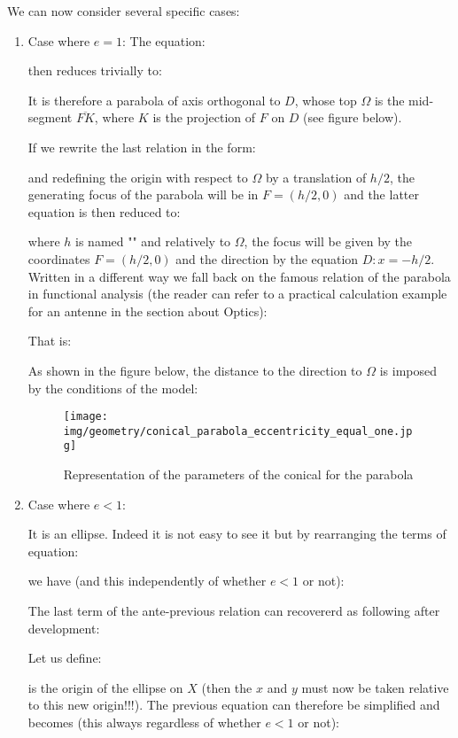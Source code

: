 	We can now consider several specific cases:
	\begin{enumerate}
		\item Case where $e=1$:
		The equation:
		
		then reduces trivially to:
		
		It is therefore a parabola of axis orthogonal to $D$, whose top $\Omega$ is the mid-segment $\overline{FK}$, where $K$ is the projection of $F$ on $D$ (see figure below).
		
		If we rewrite the last relation in the form:
		
		and redefining the origin with respect to $\Omega$ by a translation of $h/2$, the generating focus of the parabola will be in $F=(h/2,0)$ and the latter equation is then reduced to:
		
		where $h$ is named "" and relatively to $\Omega$, the focus will be given by the coordinates $F=(h/2,0)$ and the direction by the equation $D:x=-h/2$. Written in a different way we fall back on the famous relation of the parabola in functional analysis (the reader can refer to a practical calculation example for an antenne in the section about Optics):
		
		That is:
		
		As shown in the figure below, the distance to the direction to $\Omega$ is imposed by the conditions of the model:
		\begin{figure}[H]
			\centering
			\texttt{[image: img/geometry/conical\_parabola\_eccentricity\_equal\_one.jpg]}
			\caption{Representation of the parameters of the conical for the parabola}
		\end{figure}
	
		\item Case where $e<1$:
		
		It is an ellipse. Indeed it is not easy to see it but by rearranging the terms of equation:
		
		we have (and this independently of whether $e<1$ or not):
		
		The last term of the ante-previous relation can recovererd as following after development:
		
		Let us define:
		
		is the origin of the ellipse on $X$ (then the $x$ and $y$ must now be taken relative to this new origin!!!). The previous equation can therefore be simplified and becomes (this always regardless of whether $e<1$ or not):
		

\end{enumerate}
